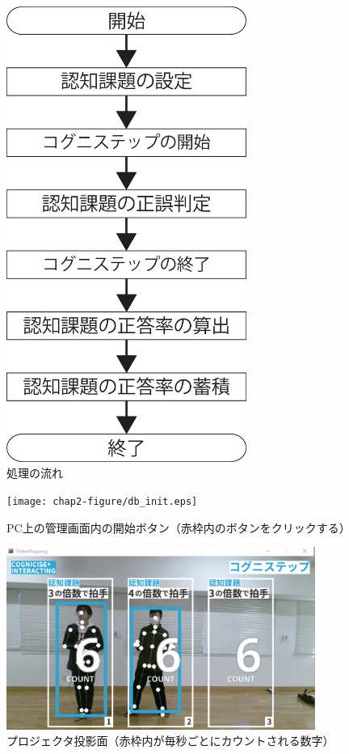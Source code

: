 \begin{figure}[tbp]
	\centering
			\includegraphics[width=0.7\textwidth]{chap2-figure/system_flow.eps}
	\caption{処理の流れ}
	\label{fig:system_flow}
\end{figure}

\begin{figure}[tbp]
	\centering
			\texttt{[image: chap2-figure/db\_init.eps]}
	\caption{PC上の管理画面内の開始ボタン（赤枠内のボタンをクリックする）}
	\label{fig:db_start}
\end{figure}

\begin{figure}[tbp]
	\centering
			\includegraphics[width=0.9\textwidth]{chap2-figure/vm_active.eps}
	\caption{プロジェクタ投影面（赤枠内が毎秒ごとにカウントされる数字）}
	\label{fig:vm_active}
\end{figure}

